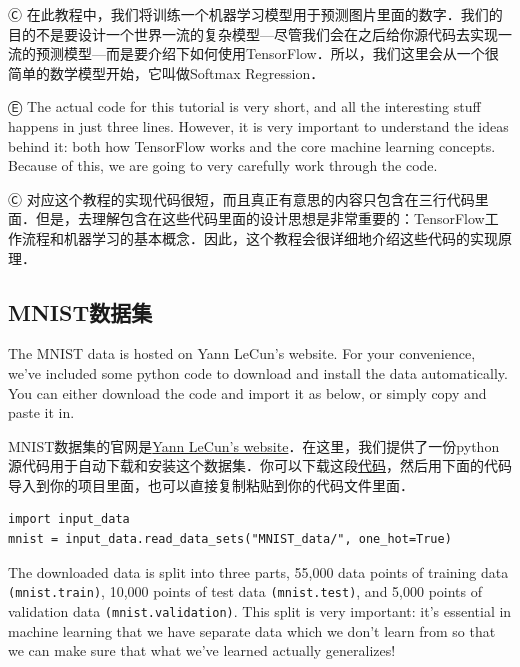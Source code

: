 Ⓒ 在此教程中，我们将训练一个机器学习模型用于预测图片里面的数字．我们的目的不是要设计一个世界一流的复杂模型---尽管我们会在之后给你源代码去实现一流的预测模型---而是要介绍下如何使用TensorFlow．所以，我们这里会从一个很简单的数学模型开始，它叫做Softmax Regression．

Ⓔ The actual code for this tutorial is very short, and all the interesting stuff happens in just three lines. However, it is very important to understand the ideas behind it: both how TensorFlow works and the core machine learning concepts. Because of this, we are going to very carefully work through the code.

Ⓒ 对应这个教程的实现代码很短，而且真正有意思的内容只包含在三行代码里面．但是，去理解包含在这些代码里面的设计思想是非常重要的：TensorFlow工作流程和机器学习的基本概念．因此，这个教程会很详细地介绍这些代码的实现原理．

\subsection {MNIST数据集}

The MNIST data is hosted on Yann LeCun's website. For your convenience, we've included some python code to download and install the data automatically. You can either download the code and import it as below, or simply copy and paste it in.

MNIST数据集的官网是\href{http://yann.lecun.com/exdb/mnist/}{Yann LeCun's website}．在这里，我们提供了一份python源代码用于自动下载和安装这个数据集．你可以下载这段\href{https://tensorflow.googlesource.com/tensorflow/+/master/tensorflow/examples/tutorials/mnist/input_data.py}{代码}，然后用下面的代码导入到你的项目里面，也可以直接复制粘贴到你的代码文件里面．

\begin{lstlisting}
import input_data
mnist = input_data.read_data_sets("MNIST_data/", one_hot=True)
\end{lstlisting}

The downloaded data is split into three parts, 55,000 data points of training data \lstinline{(mnist.train)}, 10,000 points of test data \lstinline{(mnist.test)}, and 5,000 points of validation data \lstinline{(mnist.validation)}. This split is very important: it's essential in machine learning that we have separate data which we don't learn from so that we can make sure that what we've learned actually generalizes!

